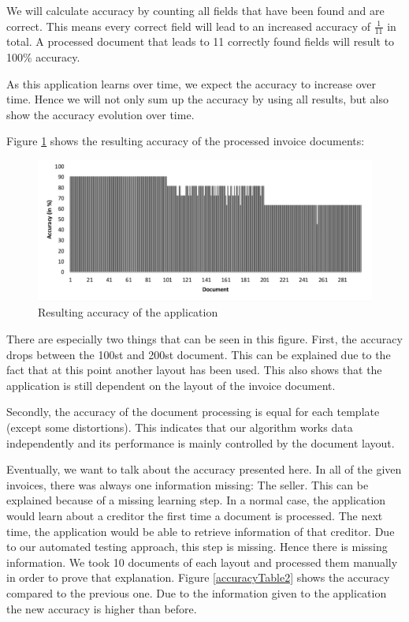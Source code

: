We will calculate accuracy by counting all fields that have been found and are correct. This means every correct field will lead to an increased accuracy of $\frac{1}{11}$ in total. A processed document that leads to 11 correctly found fields will result to 100\% accuracy. 

As this application learns over time, we expect the accuracy to increase over time. Hence we will not only sum up the accuracy by using all results, but also show the accuracy evolution over time.

Figure \ref{accuracyTable} shows the resulting accuracy of the processed invoice documents: 
\begin{figure}[ht!]
\centering
\includegraphics[width=\textwidth]{Images/Accuracy/Values.pdf}
\caption{Resulting accuracy of the application \label{accuracyTable}}
\end{figure}

There are especially two things that can be seen in this figure. First, the accuracy drops between the 100st and 200st document. This can be explained due to the fact that at this point another layout has been used. This also shows that the application is still dependent on the layout of the invoice document.

Secondly, the accuracy of the document processing is equal for each template (except some distortions). This indicates that our algorithm works data independently and its performance is mainly controlled by the document layout.

Eventually, we want to talk about the accuracy presented here. In all of the given invoices, there was always one information missing: The seller. This can be explained because of a missing learning step. In a normal case, the application would learn about a creditor the first time a document is processed. The next time, the application would be able to retrieve information of that creditor. Due to our automated testing approach, this step is missing. Hence there is missing information.
We took 10 documents of each layout and processed them manually in order to prove that explanation. Figure \ref{accuracyTable2} shows the accuracy compared to the previous one. Due to the information given to the application the new accuracy is higher than before.

